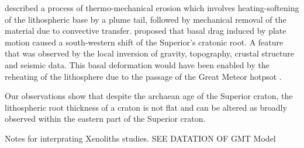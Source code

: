 \documentclass[12pt]{article}
\begin{document}
		\cite{davies1994thermomechanical} described a process of thermo-mechanical erosion which involves heating-softening of the lithospheric base by a plume tail, followed by mechanical removal of the material due to convective transfer. \citep{rondenay2000lithospheric}
		\cite{kaban2015cratonic} proposed that basal drag induced by plate motion caused a south-western shift of the Superior's cratonic root. A feature that was observed by the local inversion of gravity, topography, crustal structure and seismic data. This basal deformation would have been enabled by the reheating of the lithosphere due to the passage of the Great Meteor hotpsot \citep[see][]{eaton2007seismic,kaban2015cratonic}.

		Our observations show that despite the archaean age of the Superior craton, the lithospheric root thickness of a craton is not flat and can be altered as broadly observed within the eastern part of the Superior craton.

	

	Notes for interprating Xenoliths studies. SEE DATATION OF GMT Model
\end{document}
